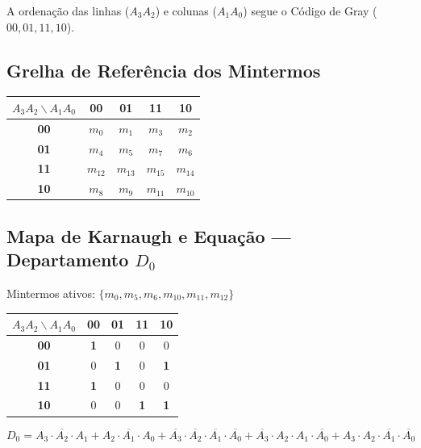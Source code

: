 \documentclass[11pt,a4paper]{article}
\begin{document}
A ordenação das linhas ($A_3 A_2$) e colunas ($A_1 A_0$) segue o Código de Gray ($00, 01, 11, 10$).

\subsection{Grelha de Referência dos Mintermos}
\begin{table}[h!]
\centering
\begin{tabular}{|c|c|c|c|c|}
\hline
\rowcolor{primary!15} \textbf{$A_3 A_2 \backslash A_1 A_0$} & \textbf{00} & \textbf{01} & \textbf{11} & \textbf{10} \\ \hline
\textbf{00} & $m_0$ & $m_1$ & $m_3$ & $m_2$ \\ \hline
\textbf{01} & $m_4$ & $m_5$ & $m_7$ & $m_6$ \\ \hline
\textbf{11} & $m_{12}$ & $m_{13}$ & $m_{15}$ & $m_{14}$ \\ \hline
\textbf{10} & $m_8$ & $m_9$ & $m_{11}$ & $m_{10}$ \\ \hline
\end{tabular}
\end{table}

\subsection{\texorpdfstring{Mapa de Karnaugh e Equação --- Departamento $D_0$}{Mapa D0}}
Mintermos ativos: $\{m_0, m_5, m_6, m_{10}, m_{11}, m_{12}\}$

\begin{table}[h!]
\centering
\begin{tabular}{|c|c|c|c|c|}
\hline
\rowcolor{secondary} \textbf{$A_3 A_2 \backslash A_1 A_0$} & \textbf{00} & \textbf{01} & \textbf{11} & \textbf{10} \\ \hline
\textbf{00} & \textbf{\textcolor{accent}{1}} & 0 & 0 & 0 \\ \hline
\textbf{01} & 0 & \textbf{\textcolor{accent}{1}} & 0 & \textbf{\textcolor{accent}{1}} \\ \hline
\textbf{11} & \textbf{\textcolor{accent}{1}} & 0 & 0 & 0 \\ \hline
\textbf{10} & 0 & 0 & \textbf{\textcolor{accent}{1}} & \textbf{\textcolor{accent}{1}} \\ \hline
\end{tabular}
\end{table}

\begin{equation}
D_0 = A_3 \cdot \overline{A_2} \cdot A_1 + A_2 \cdot \overline{A_1} \cdot A_0 + \overline{A_3} \cdot \overline{A_2} \cdot \overline{A_1} \cdot \overline{A_0} + \overline{A_3} \cdot A_2 \cdot A_1 \cdot \overline{A_0} + A_3 \cdot A_2 \cdot \overline{A_1} \cdot \overline{A_0}
\end{equation}
\end{document}
